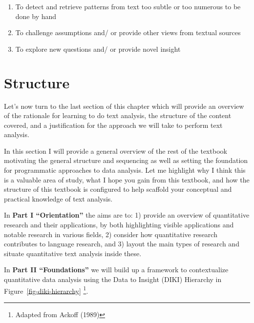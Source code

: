 \documentclass[
  letterpaper,
]{scrbook}
\providecommand{\tightlist}{%
  \setlength{\itemsep}{0pt}\setlength{\parskip}{0pt}}\usepackage{longtable,booktabs,array}
\begin{document}
\begin{enumerate}
\def\labelenumi{\arabic{enumi}.}
\tightlist
\item
  To detect and retrieve patterns from text too subtle or too numerous
  to be done by hand
\item
  To challenge assumptions and/ or provide other views from textual
  sources
\item
  To explore new questions and/ or provide novel insight
\end{enumerate}

\hypertarget{structure}{%
\section{Structure}\label{structure}}

Let's now turn to the last section of this chapter which will provide an
overview of the rationale for learning to do text analysis, the
structure of the content covered, and a justification for the approach
we will take to perform text analysis.

In this section I will provide a general overview of the rest of the
textbook motivating the general structure and sequencing as well as
setting the foundation for programmatic approaches to data analysis. Let
me highlight why I think this is a valuable area of study, what I hope
you gain from this textbook, and how the structure of this textbook is
configured to help scaffold your conceptual and practical knowledge of
text analysis.

In \textbf{Part I ``Orientation''} the aims are to: 1) provide an
overview of quantitative research and their applications, by both
highlighting visible applications and notable research in various
fields, 2) consider how quantitative research contributes to language
research, and 3) layout the main types of research and situate
quantitative text analysis inside these.

In \textbf{Part II ``Foundations''} we will build up a framework to
contextualize quantitative data analysis using the Data to Insight
(DIKI) Hierarchy in Figure~\ref{fig-diki-hierarchy} \footnote{Adapted
  from Ackoff (1989)}.
\end{document}
